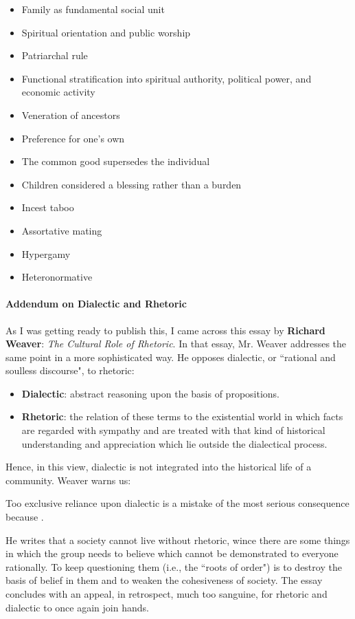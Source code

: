 \begin{itemize}
\item Family as fundamental social unit 
\item Spiritual orientation and public worship 
\item Patriarchal rule 
\item Functional stratification into spiritual authority, political power, and economic activity 
\item Veneration of ancestors 
\item Preference for one's own 
\item The common good supersedes the individual 
\item Children considered a blessing rather than a burden 
\item Incest taboo 
\item Assortative mating 
\item Hypergamy 
\item Heteronormative 
\end{itemize}
\paragraph{Addendum on Dialectic and Rhetoric}
As I was getting ready to publish this, I came across this essay by \textbf{Richard Weaver}: \emph{The Cultural Role of Rhetoric}. In that essay, Mr. Weaver addresses the same point in a more sophisticated way. He opposes dialectic, or ``rational and soulless discourse", to rhetoric:

\begin{itemize}
\item \textbf{Dialectic}: abstract reasoning upon the basis of propositions. 
\item \textbf{Rhetoric}: the relation of these terms to the existential world in which facts are regarded with sympathy and are treated with that kind of historical understanding and appreciation which lie outside the dialectical process. 
\end{itemize}
Hence, in this view, dialectic is not integrated into the historical life of a community. Weaver warns us:

\begin{quotex}
Too exclusive reliance upon dialectic is a mistake of the most serious consequence because .

\end{quotex}
He writes that a society cannot live without rhetoric, wince there are some things in which the group needs to believe which cannot be demonstrated to everyone rationally. To keep questioning them (i.e., the ``roots of order") is to destroy the basis of belief in them and to weaken the cohesiveness of society. The essay concludes with an appeal, in retrospect, much too sanguine, for rhetoric and dialectic to once again join hands.

